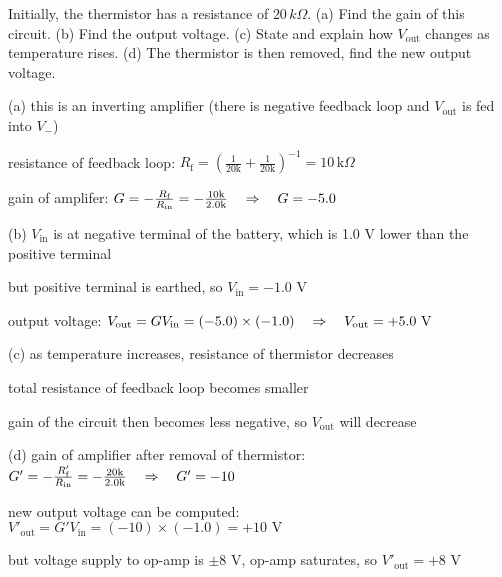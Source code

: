 Initially, the thermistor has a resistance of $20\,k\Omega$. (a) Find the gain of this circuit. (b) Find the output voltage. (c) State and explain how $V_\text{out}$ changes as temperature rises. (d) The thermistor is then removed, find the new output voltage.

\newpage

\solc \begin{compactitem}
	\item[(a)] this is an inverting amplifier (there is negative feedback loop and $V_\text{out}$ is fed into $V_-$)
	
	resistance of feedback loop: $R_\text{f} = \left(\frac{1}{20\text{k}} + \frac{1}{20\text{k}}\right)^{-1} = 10 \, \text{k}\Omega$
	
	\eqyskip gain of amplifer: $G= - \frac{R_\text{f}}{R_\text{in}} = -\frac{10\text{k}}{2.0\text{k}} \quad \Rightarrow \quad G=-5.0$
	
	\item[(b)] $V_\text{in}$ is at negative terminal of the battery, which is 1.0 V lower than the positive terminal
	
	but positive terminal is earthed, so $V_\text{in} = -1.0 \text{ V}$
	
	output voltage: $V_\text{out} = GV_\text{in} = (-5.0) \times (-1.0) \quad \Rightarrow \quad V_\text{out} = +5.0 \text{ V}$
	
	\item[(c)] as temperature increases, resistance of thermistor decreases
	
	total resistance of feedback loop becomes smaller
	
	gain of the circuit then becomes less negative, so $V_\text{out}$ will decrease
	
	\item[(d)] gain of amplifier after removal of thermistor: $G' = - \frac{R'_\text{f}}{R_\text{in}} = - \frac{20\text{k}}{2.0\text{k}} \quad \Rightarrow \quad G' = -10$
	
	new output voltage can be computed: $V'_\text{out} = G'V_\text{in} = (-10)\times(-1.0) = +10 \text{ V}$
	
	but voltage supply to op-amp is $\pm 8 \text{ V}$, op-amp saturates, so $V'_\text{out} = +8 \text{ V}$ \eoe
\end{compactitem}


